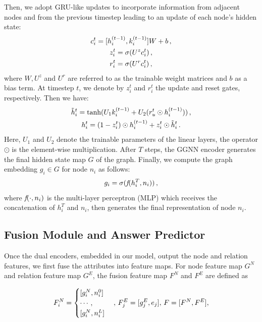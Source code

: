 \documentclass[letterpaper]{article} %
\begin{document}
Then, we adopt GRU-like updates to incorporate information from adjacent nodes and from the previous timestep leading to an update of each node's hidden state:
\begin{gather}\notag
    c_i^t = [h_i^{(t-1)}, k_{i}^{(t-1)}] W + b \, ,\\\notag
    z_i^t = \sigma(U^z c_i^t) \, , \\\notag
    r_i^t = \sigma(U^r c_i^t)\, , \notag
\end{gather}
where $W, U^z$ and $U^r$ are referred to as the trainable weight matrices and $b$ as a bias term.
At timestep $t$, we denote by $z_i^t$ and $r_i^t$ the update and reset gates, respectively. Then we have:
\begin{gather}\notag
    \tilde{h}_i^t = \text{tanh}(U_1 k_{i}^{(t-1)} + U_2(r_u^t \odot h_i^{(t-1)})) \, ,\\\notag
    h_i^t = (1-z_i^t)\odot h_i^{(t-1)} + z_i^t\odot \tilde{h}_i^t \, .\notag
\end{gather}
Here, $U_1$ and $U_2$ denote the trainable parameters of the linear layers, the operator $\odot$ is the element-wise multiplication.
After $T$ steps, the GGNN encoder generates the final hidden state map $G$ of the graph. 
Finally, we compute the graph embedding $g_i \in G$ for node ${n}_i$ as follows:
\begin{equation}\notag
    g_i = \sigma( \emph{f}(h_i^T, n_i)) \, ,
\end{equation}
where $\emph{f}(\cdot, n_i)$ is the multi-layer perceptron (MLP) which receives the concatenation of $h_i^T$ and $n_i$, then generates the final representation of node ${n}_i$. 

\subsection{Fusion Module and Answer Predictor}

Once the dual encoders, embedded in our model, output the node and relation features, we first fuse the attributes into feature maps. 
For node feature map $G^N$ and relation feature map $G^E$, the fusion feature map $F^N$ and $F^E$ are defined as

{\small \begin{equation}\notag
F_i^N= \begin{cases}
[g_i^N, n_i^0]  \\
\cdots, \\
[g_i^N, n_i^L]
\end{cases} 
,\, F_j^E = [g_j^E, e_j] , \,
    F = [F^N, F^E]  ,
\end{equation}
}
\end{document}
